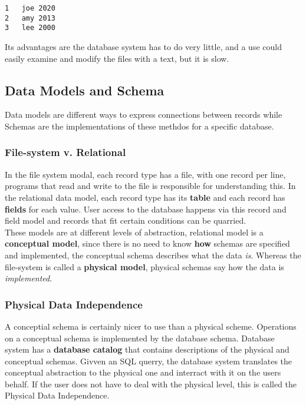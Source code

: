 \documentclass[11pt,a4paper,twocolumn]{book}
\begin{document}
\begin{lstlisting}
1	joe	2020
2	amy	2013
3	lee	2000
\end{lstlisting}

Its advantages are the database system has to do very little, and a use could easily examine and modify the files with a text, but it is slow. \missing

\subsection{Data Models and Schema}

Data models are different ways to express connections between records while Schemas are the implementations of these methdos for a specific database.

\subsubsection{File-system v. Relational}

In the file system modal, each record type has a file, with one record per line, programs that read and write to the file is responsible for understanding this. In the relational data model, each record type has its \textbf{table} and each record has \textbf{fields} for each value. User access to the database happens via this record and field model and records that fit certain conditions can be quarried.\\

These models are at different levels of abstraction, relational model is a \textbf{conceptual model}, since there is no need to know \textbf{how} schemas are specified and implemented, the conceptual schema describes what the data \textit{is}. Whereas the file-system is called a \textbf{physical model}, physical schemas say how the data is \textit{implemented}.

\subsubsection{Physical Data Independence}

A conceptial schema is certainly nicer to use than a physical scheme. Operations on a conceptual schema is implemented by the database schema. Database system has a \textbf{database catalog} that contains descriptions of the physical and conceptual schemas. Givven an SQL querry, the database system translates the conceptual abstraction to the physical one and interract with it on the users behalf. If the user does not have to deal with the physical level, this is called the Physical Data Independence.
\end{document}
